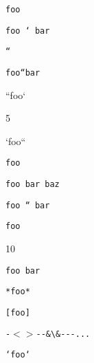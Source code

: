 \texttt{foo}

\texttt{foo ` bar}

\texttt{``}

\texttt{foo``bar}

``foo`

5

`foo``

\texttt{foo}

\texttt{foo   bar
baz}

\texttt{foo `` bar}

\texttt{foo}

10

\texttt{foo   bar}

\texttt{*foo*}

\texttt{[foo]}

\texttt{-$<$$>$-{}-\&\textbackslash{}\&-{}-{}-...}

\texttt{`foo`}

